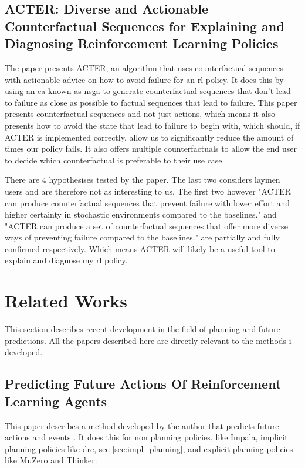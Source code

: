 \documentclass[UKenglish]{uiomasterthesis}
\begin{document}
\subsection{ACTER: Diverse and Actionable Counterfactual Sequences for Explaining and Diagnosing Reinforcement Learning Policies}
\label{sec:acter}
The paper presents ACTER, an algorithm that uses counterfactual sequences with actionable advice on how to avoid failure for an \ac{rl} policy. It does this by using an \ac{ea} known as \ac{nsga} to generate counterfactual sequences that don't lead to failure as close as possible to factual sequences that lead to failure. This paper presents counterfactual sequences and not just actions, which means it also presents how to avoid the state that lead to failure to begin with, which should, if ACTER is implemented correctly, allow us to significantly reduce the amount of times our policy fails. It also offers multiple counterfactuals to allow the end user to decide which counterfactual is preferable to their use case.

There are 4 hypothesises tested by the paper. The last two considers laymen users and are therefore not as interesting to us. The first two however "ACTER can produce counterfactual sequences that prevent failure with lower effort and higher certainty in stochastic environments compared to the baselines." and "ACTER can produce a set of counterfactual sequences that offer more diverse ways of preventing failure compared to the baselines." are partially and fully confirmed respectively. Which means ACTER will likely be a useful tool to explain and diagnose my \ac{rl} policy.


\section{Related Works}
This section describes recent development in the field of planning and future predictions. All the papers described here are directly relevant to the methods i developed.

\subsection{Predicting Future Actions Of Reinforcement Learning Agents}
\label{sec:predicting_actions}
This paper describes a method developed by the author that predicts future actions and events \cite{chung2024predictingfutureactionsreinforcement}. It does this for non planning policies, like Impala, implicit planning policies like \ac{drc}, see \cref{sec:impl_planning}, and explicit planning policies like MuZero and Thinker.
\end{document}
